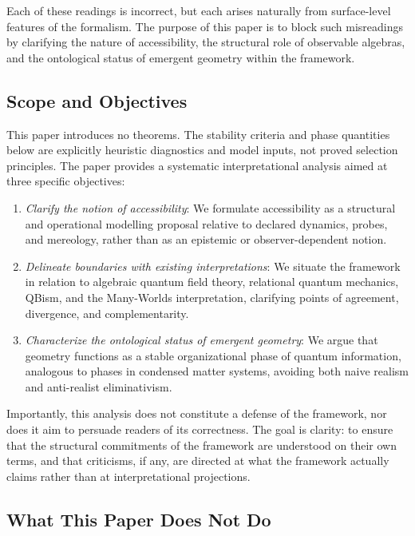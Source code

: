 \documentclass[12pt,a4paper,openany]{book}
\begin{document}
Each of these readings is incorrect, but each arises naturally from surface-level features of the formalism. 
The purpose of this paper is to block such misreadings by clarifying the nature of accessibility, the structural role of observable algebras, and the ontological status of emergent geometry within the framework.

\subsection{Scope and Objectives}

This paper introduces no theorems.  The stability criteria and phase quantities below are explicitly heuristic diagnostics and model inputs, not proved selection principles.  The paper provides a systematic interpretational analysis aimed at three specific objectives:

\begin{enumerate}
\item \emph{Clarify the notion of accessibility}: We formulate accessibility as a structural and operational modelling proposal relative to declared dynamics, probes, and mereology, rather than as an epistemic or observer-dependent notion.
\item \emph{Delineate boundaries with existing interpretations}: We situate the framework in relation to algebraic quantum field theory, relational quantum mechanics, QBism, and the Many-Worlds interpretation, clarifying points of agreement, divergence, and complementarity.
\item \emph{Characterize the ontological status of emergent geometry}: We argue that geometry functions as a stable organizational phase of quantum information, analogous to phases in condensed matter systems, avoiding both naive realism and anti-realist eliminativism.
\end{enumerate}

Importantly, this analysis does not constitute a defense of the framework, nor does it aim to persuade readers of its correctness. 
The goal is clarity: to ensure that the structural commitments of the framework are understood on their own terms, and that criticisms, if any, are directed at what the framework actually claims rather than at interpretational projections.

\subsection{What This Paper Does Not Do}
\end{document}
